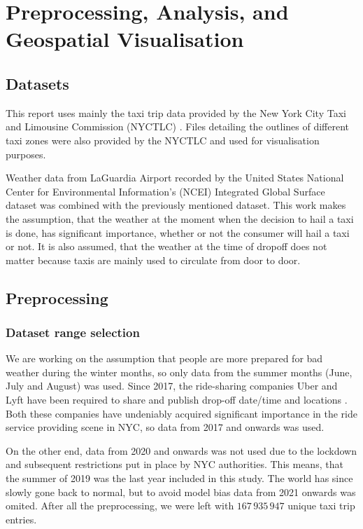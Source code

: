 \documentclass[11pt]{article}
\begin{document}
\section{Preprocessing, Analysis, and Geospatial Visualisation}

\subsection{Datasets}
This report uses mainly the taxi trip data provided by the New York City Taxi and Limousine Commission (NYCTLC) \cite{nyctlcData}. Files detailing the outlines of different taxi zones were also provided by the NYCTLC and used for visualisation purposes.

Weather data from LaGuardia Airport recorded by the United States National Center for Environmental Information's (NCEI) Integrated Global Surface dataset \cite{weatherData} was combined with the previously mentioned dataset. This work makes the assumption, that the weather at the moment when the decision to hail a taxi is done, has significant importance, whether or not the consumer will hail a taxi or not. It is also assumed, that the weather at the time of dropoff does not matter because taxis are mainly used to circulate from door to door.

\subsection{Preprocessing}

\subsubsection{Dataset range selection}

We are working on the assumption that people are more prepared for bad weather during the winter months, so only data from the summer months (June, July and August) was used. Since 2017, the ride-sharing companies Uber and Lyft have been required to share and publish drop-off date/time and locations \cite{tripUserGuide}. Both these companies have undeniably acquired significant importance in the ride service providing scene in NYC, so data from 2017 and onwards was used. 

On the other end, data from 2020 and onwards was not used due to the lockdown and subsequent restrictions put in place by NYC authorities. This means, that the summer of 2019 was the last year included in this study. The world has since slowly gone back to normal, but to avoid model bias data from 2021 onwards was omited. After all the preprocessing, we were left with $167\,935\,947$ unique taxi trip entries.
\end{document}
